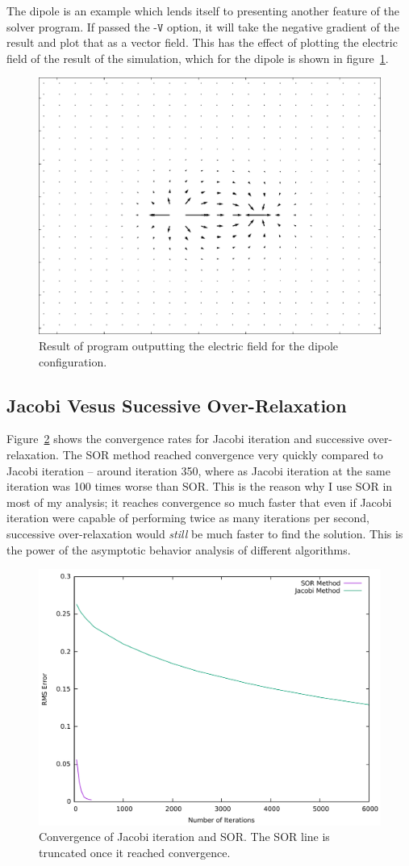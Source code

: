The dipole is an example which lends itself to presenting another feature of the solver program. If passed the
$\texttt{-V}$ option, it will take the negative gradient of the result and plot that as a vector field. This has
the effect of plotting the electric field of the result of the simulation, which for the dipole is shown in
figure~\ref{fig:dipole-field}.

	\begin{figure}[h]
	\centering
	\includegraphics[width=0.7\linewidth]{dipole_field.pdf}
	\caption{Result of program outputting the electric field for the dipole configuration.} \label{fig:dipole-field}
	\end{figure}


\subsection{Jacobi Vesus Sucessive Over-Relaxation}
Figure~\ref{fig:jacsor} shows the convergence rates for Jacobi iteration and successive over-relaxation. The SOR method
reached convergence very quickly compared to Jacobi iteration -- around iteration 350, where as Jacobi iteration at the
same iteration was 100 times worse than SOR. This is the reason why I use SOR in most of my analysis; it reaches convergence
so much faster that even if Jacobi iteration were capable of performing twice as many iterations per second, successive over-relaxation
would \textit{still} be much faster to find the solution. This is the power of the asymptotic behavior analysis of different algorithms.

	\begin{figure}[h]
	\centering
	\includegraphics[width=0.7\linewidth]{jacsor.pdf}
	\caption{Convergence of Jacobi iteration and SOR. The SOR line is truncated once it reached convergence.} \label{fig:jacsor}
	\end{figure}




